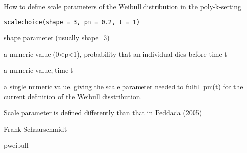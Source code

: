 \begin{Description}\relax
How to define scale parameters of the Weibull distribution in the poly-k-setting
\end{Description}
\begin{Usage}
\begin{verbatim}
scalechoice(shape = 3, pm = 0.2, t = 1)
\end{verbatim}
\end{Usage}
\begin{Arguments}
\begin{ldescription}
\item[\code{shape}] shape parameter (usually shape=3) 
\item[\code{pm}] a numeric value (0<p<1), probability that an individual dies before time t 
\item[\code{t}] a numeric value, time t 
\end{ldescription}
\end{Arguments}
\begin{Value}
a single numeric value, giving the scale parameter needed to fulfill pm(t) for the current definition of the Weibull disstribution.
\end{Value}
\begin{Note}\relax
Scale parameter is defined differently than that in Peddada (2005)
\end{Note}
\begin{Author}\relax
Frank Schaarschmidt
\end{Author}
\begin{References}\relax
\end{References}
\begin{SeeAlso}\relax
pweibull
\end{SeeAlso}
\begin{Examples}
\begin{ExampleCode}
\end{ExampleCode}
\end{Examples}

